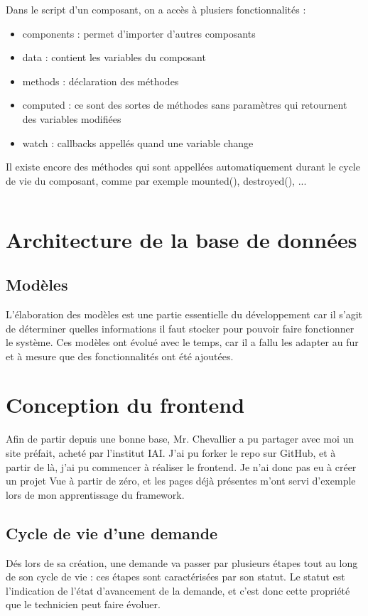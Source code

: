 \documentclass[
    iai, %
    eai, %
]{heig-tb}
\begin{document}
Dans le script d'un composant, on a accès à plusiers fonctionnalités :
\begin{itemize}
  \item components : permet d'importer d'autres composants
  \item data : contient les variables du composant
  \item methods : déclaration des méthodes
  \item computed : ce sont des sortes de méthodes sans paramètres qui retournent des variables modifiées
  \item watch : callbacks appellés quand une variable change
\end{itemize}
\bigskip
Il existe encore des méthodes qui sont appellées automatiquement durant le cycle de vie du composant, comme par exemple mounted(), destroyed(), ...
\newpage
\inputminted[breaklines]{html}{assets/code/component_example.vue}

\chapter{Architecture de la base de données}
\section{Modèles}
L'élaboration des modèles est une partie essentielle du développement car il s'agit de déterminer quelles informations il faut stocker pour pouvoir faire fonctionner le système.
Ces modèles ont évolué avec le temps, car il a fallu les adapter au fur et à mesure que des fonctionnalités ont été ajoutées.

\chapter{Conception du frontend}
Afin de partir depuis une bonne base, Mr. Chevallier a pu partager avec moi un site préfait, acheté par l'institut IAI.
J'ai pu forker le repo sur GitHub, et à partir de là, j'ai pu commencer à réaliser le frontend.
Je n'ai donc pas eu à créer un projet Vue à partir de zéro, et les pages déjà présentes m'ont servi d'exemple lors de mon apprentissage du framework.

\section{Cycle de vie d'une demande}
Dés lors de sa création, une demande va passer par plusieurs étapes tout au long de son cycle de vie : ces étapes sont caractérisées par son statut.
Le statut est l'indication de l'état d'avancement de la demande, et c'est donc cette propriété que le technicien peut faire évoluer.
\end{document}
